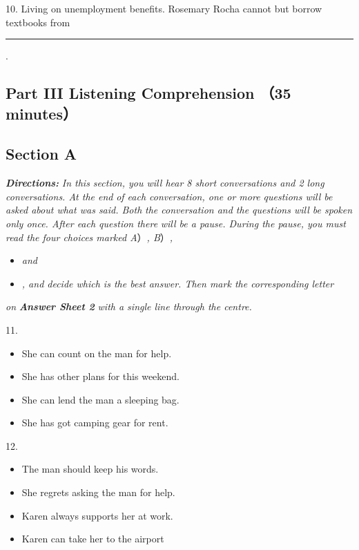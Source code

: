 \documentclass[UTF8,11pt]{ctexart}
\begin{document}
10. Living on unemployment benefits. Rosemary Rocha cannot but borrow textbooks from\par\noindent\rule{.95\linewidth}{.4pt}\par .


\subsection*{\textbf{Part III} \textbf{Listening Comprehension} （\textbf{35 minutes}）}


\subsection*{\textbf{Section A}}


\textbf{\textit{Directions:}}\textit{ In this section, you will hear 8 short conversations and 2 long conversations. At the end} \textit{of each conversation, one or more questions will be asked about what was said. Both} \textit{the conversation and the questions will be spoken only once. After each question there} \textit{will be a pause. During the pause, you must read the four choices marked A}）\textit{, B}）\textit{,}


\begin{itemize}[leftmargin=2em,itemsep=.2em,topsep=.4em]\item[C.] \textit{and}
\item[D.] \textit{, and decide which is the best answer. Then mark the corresponding letter}
\end{itemize}

\textit{on}\textbf{\textit{ Answer Sheet 2}}\textit{ with a single line through the centre.}


11.


\begin{itemize}[leftmargin=2em,itemsep=.2em,topsep=.4em]\item[A.] She can count on the man for help.
\item[B.] She has other plans for this weekend.
\item[C.] She can lend the man a sleeping bag.
\item[D.] She has got camping gear for rent.
\end{itemize}

12.


\begin{itemize}[leftmargin=2em,itemsep=.2em,topsep=.4em]\item[A.] The man should keep his words.
\item[B.] She regrets asking the man for help.
\item[C.] Karen always supports her at work.
\item[D.] Karen can take her to the airport
\end{itemize}
\end{document}
